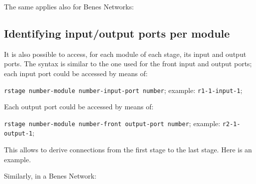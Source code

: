 \documentclass{ltxdoc} %
\begin{document}
The same applies also for Benes Networks:
\begin{codeexample}[]
\end{codeexample}


\subsection{Identifying input/output ports per module}

It is also possible to access, for each module of each stage, its input and output ports. The syntax is similar to the one used for the front input and output ports; each input port could be accessed by means of:
\begin{flushleft}
\verb|r|\bgroup\color{red!75!black}\verb|stage number|\egroup\verb|-|\bgroup\color{red!75!black}\verb|module number|\egroup\verb|-|\bgroup\color{red!75!black}\verb|input|\egroup\verb|-|\bgroup\color{red!75!black}\verb|port number|\egroup; example: \verb|r1-1-input-1|;
\end{flushleft}
Each output port could be accessed by means of:
\begin{flushleft}
\verb|r|\bgroup\color{red!75!black}\verb|stage number|\egroup\verb|-|\bgroup\color{red!75!black}\verb|module number|\egroup\verb|-|\bgroup\color{red!75!black}\verb|front output|\egroup\verb|-|\bgroup\color{red!75!black}\verb|port number|\egroup; example: \verb|r2-1-output-1|;
\end{flushleft}
This allows to derive connections from the first stage to the last stage. Here is an example. 

\begin{codeexample}[]
\end{codeexample}
Similarly, in a Benes Network:
\end{document}
